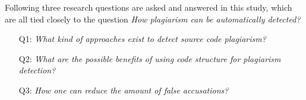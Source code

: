 Following three research questions are asked and answered in this study, which are all tied closely to the question \emph{How plagiarism can be automatically detected?}

\begin{itemize}
    \item[Q1:] \emph{What kind of approaches exist to detect source code plagiarism?}
    \item[Q2:] \emph{What are the possible benefits of using code structure for plagiarism detection?}
    \item[Q3:] \emph{How one can reduce the amount of false accusations?}
\end{itemize}




